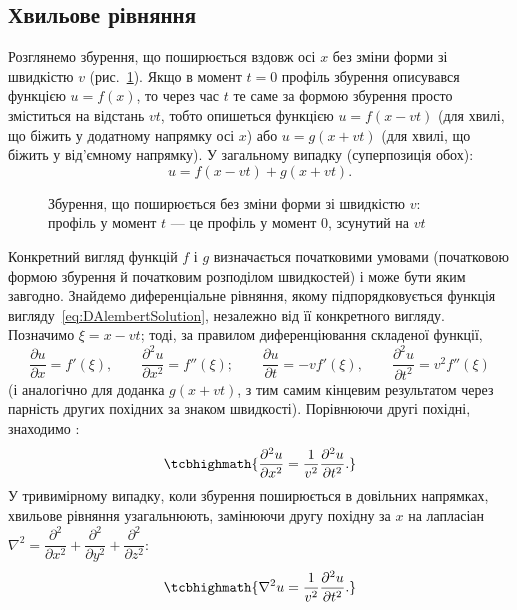 \subsection*{Хвильове рівняння}

Розглянемо збурення, що поширюється вздовж осі $x$ без зміни форми зі швидкістю $v$ (рис.~\ref{pic:Perturbation}). Якщо в момент $t=0$ профіль
збурення описувався функцією $u=f(x)$, то через час $t$ те саме за формою збурення просто зміститься на відстань $vt$, тобто опишеться функцією
$u = f(x-vt)$ (для хвилі, що біжить у додатному напрямку осі $x$) або $u=g(x+vt)$ (для хвилі, що біжить у від'ємному напрямку). У загальному
випадку (суперпозиція обох):
\begin{equation}\label{eq:DAlembertSolution}
	u = f(x-vt) + g(x+vt).
\end{equation}

\begin{figure}[h!]\centering
	\caption{Збурення, що поширюється без зміни форми зі швидкістю $v$: профіль у момент $t$ ---
		це профіль у момент $0$, зсунутий на $vt$\label{pic:Perturbation}}
\end{figure}

Конкретний вигляд функцій $f$ і $g$ визначається початковими умовами (початковою формою збурення й початковим розподілом швидкостей) і може бути
яким завгодно. Знайдемо диференціальне рівняння, якому підпорядковується  функція вигляду~\eqref{eq:DAlembertSolution},
незалежно від її конкретного вигляду. Позначимо $\xi = x-vt$; тоді, за правилом диференціювання складеної функції,
\begin{equation*}
	\frac{\partial u}{\partial x} = f'(\xi), \qquad \frac{\partial^2 u}{\partial x^2} = f''(\xi); \qquad \frac{\partial u}{\partial t} = -vf'(\xi),
	\qquad \frac{\partial^2u}{\partial t^2} = v^2f''(\xi)
\end{equation*}
(і аналогічно для доданка $g(x+vt)$, з тим самим кінцевим результатом через парність других похідних за знаком швидкості). Порівнюючи другі
похідні, знаходимо :
\begin{equation}\label{eq:WaveEquation1D}
	\tcbhighmath{
		\frac{\partial^2 u}{\partial x^2} = \frac1{v^2}\frac{\partial^2u}{\partial t^2}.
	}
\end{equation}
У тривимірному випадку, коли збурення поширюється в довільних напрямках, хвильове рівняння узагальнюють, замінюючи другу похідну за $x$ на
лапласіан $\nabla^2 = \dfrac{\partial^2}{\partial x^2}+\dfrac{\partial^2}{\partial y^2}+\dfrac{\partial^2}{\partial z^2}$:
\begin{equation}\label{eq:WaveEquation3D}
	\tcbhighmath{
		\nabla^2 u = \frac1{v^2}\frac{\partial^2u}{\partial t^2}.
	}
\end{equation}

